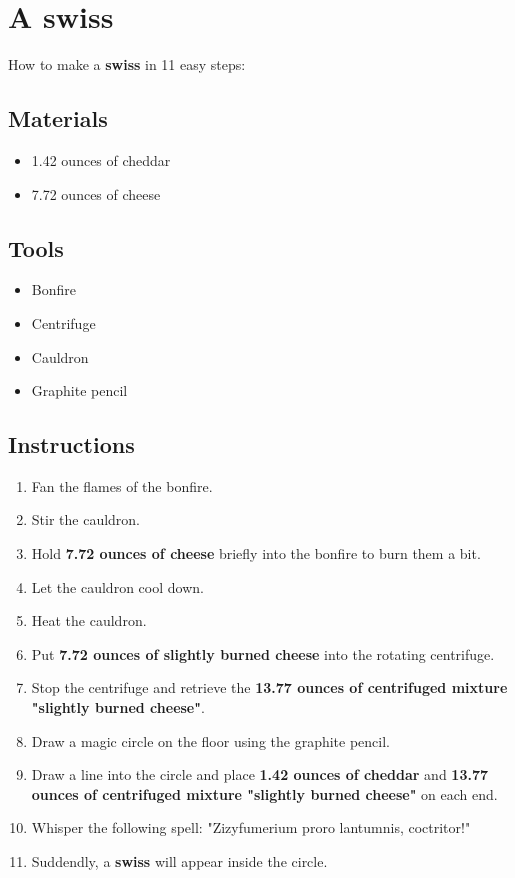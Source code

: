 \documentclass{article}
\begin{document}
\section{A swiss}How to make a \textbf{swiss} in 11 easy steps:

\subsection{Materials}\begin{itemize}
\item 
1.42 ounces of cheddar
\item 
7.72 ounces of cheese
\end{itemize}
\subsection{Tools}\begin{itemize}
\item 
Bonfire
\item 
Centrifuge
\item 
Cauldron
\item 
Graphite pencil
\end{itemize}
\subsection{Instructions}\begin{enumerate}
\item 
Fan the flames of the bonfire.
\item 
Stir the cauldron.
\item 
Hold \textbf{7.72 ounces of cheese} briefly into the bonfire to burn them a bit.
\item 
Let the cauldron cool down.
\item 
Heat the cauldron.
\item 
Put \textbf{7.72 ounces of slightly burned cheese} into the rotating centrifuge.
\item 
Stop the centrifuge and retrieve the \textbf{13.77 ounces of centrifuged mixture "slightly burned cheese"}.
\item 
Draw a magic circle on the floor using the graphite pencil.
\item 
Draw a line into the circle and place \textbf{1.42 ounces of cheddar} and \textbf{13.77 ounces of centrifuged mixture "slightly burned cheese"} on each end.
\item 
Whisper the following spell: "Zizyfumerium proro lantumnis, coctritor!"
\item 
Suddendly, a \textbf{swiss} will appear inside the circle.
\end{enumerate}
\newpage
\end{document}
